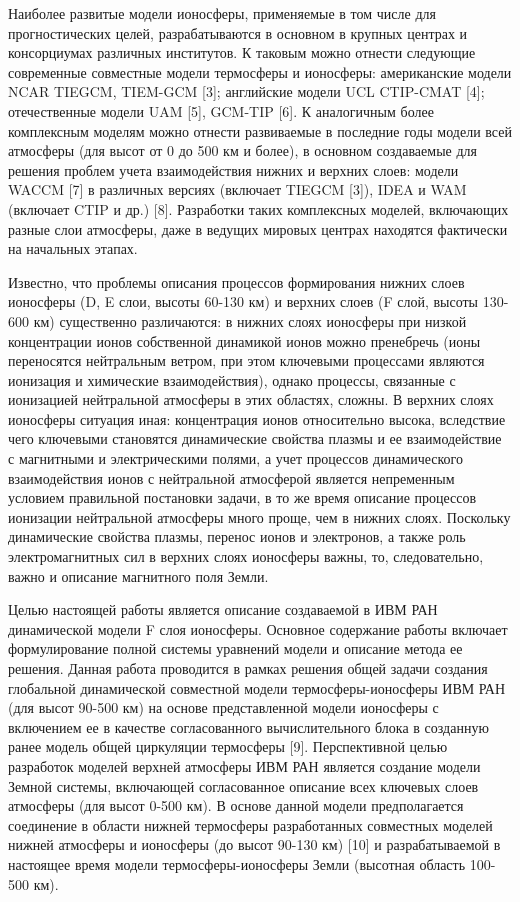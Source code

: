 \documentclass[14pt, a4paper]{extarticle}
\begin{document}
Наиболее развитые модели ионосферы, применяемые в том числе для прогностических целей, разрабатываются в основном в крупных центрах и консорциумах различных институтов. К таковым можно отнести следующие современные совместные модели термосферы и ионосферы: американские модели NCAR TIEGCM, TIEM-GCM [3]; английские модели UCL CTIP-CMAT [4]; отечественные модели UAM [5], GCM-TIP [6]. К аналогичным более комплексным моделям можно отнести развиваемые в последние годы модели всей атмосферы (для высот от 0 до 500 км и более), в основном создаваемые для решения проблем учета взаимодействия нижних и верхних слоев: модели WACCM [7] в различных версиях (включает TIEGCM [3]), IDEA и WAM (включает CTIP и др.) [8]. Разработки таких комплексных моделей, включающих разные слои атмосферы, даже в ведущих мировых центрах находятся фактически на начальных этапах.

Известно, что проблемы описания процессов формирования нижних слоев ионосферы (D, E слои, высоты 60-130 км) и верхних слоев (F слой, высоты 130-600 км) существенно различаются: в нижних слоях ионосферы при низкой концентрации ионов собственной динамикой ионов можно пренебречь (ионы переносятся нейтральным ветром, при этом ключевыми процессами являются ионизация и химические взаимодействия), однако процессы, связанные с ионизацией нейтральной атмосферы в этих областях, сложны. В верхних слоях ионосферы ситуация иная: концентрация ионов относительно высока, вследствие чего ключевыми становятся динамические свойства плазмы и ее взаимодействие с магнитными и электрическими полями, а учет процессов динамического взаимодействия ионов с нейтральной атмосферой является непременным условием правильной постановки задачи, в то же время описание процессов ионизации нейтральной атмосферы много проще, чем в нижних слоях. Поскольку динамические свойства плазмы, перенос ионов и электронов, а также роль электромагнитных сил в верхних слоях ионосферы важны, то, следовательно, важно и описание магнитного поля Земли. 

Целью настоящей работы является описание создаваемой в ИВМ РАН динамической модели F слоя ионосферы. Основное содержание работы включает формулирование полной системы уравнений модели и описание метода ее решения. Данная работа проводится в рамках решения общей задачи создания глобальной динамической совместной модели термосферы-ионосферы ИВМ РАН (для высот 90-500 км) на основе представленной модели ионосферы с включением ее в качестве согласованного вычислительного блока в созданную ранее модель общей циркуляции термосферы [9]. Перспективной целью разработок моделей верхней атмосферы ИВМ РАН является создание модели Земной системы, включающей согласованное описание всех ключевых слоев атмосферы (для высот 0-500 км). В основе данной модели предполагается соединение в области нижней термосферы разработанных совместных моделей нижней атмосферы и ионосферы (до высот 90-130 км) [10] и разрабатываемой в настоящее время модели термосферы-ионосферы Земли (высотная область 100-500 км).
\end{document}
